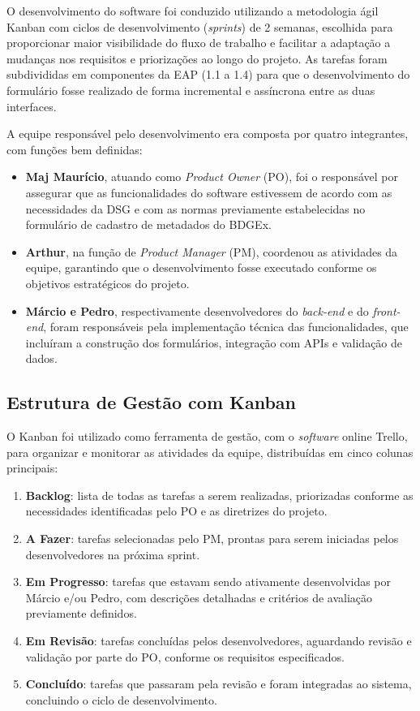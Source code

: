 O desenvolvimento do software foi conduzido utilizando a metodologia ágil Kanban com ciclos de desenvolvimento (\textit{sprints}) de 2 semanas, escolhida para proporcionar maior visibilidade do fluxo de trabalho e facilitar a adaptação a mudanças nos requisitos e priorizações ao longo do projeto. As tarefas foram subdivididas em componentes da EAP (1.1 a 1.4) para que o desenvolvimento do formulário fosse realizado de forma incremental e assíncrona entre as duas interfaces. 

A equipe responsável pelo desenvolvimento era composta por quatro integrantes, com funções bem definidas:

\begin{itemize}
    \item \textbf{Maj Maurício}, atuando como \textit{Product Owner} (PO), foi o responsável por assegurar que as funcionalidades do software estivessem de acordo com as necessidades da DSG e com as normas previamente estabelecidas no formulário de cadastro de metadados do BDGEx.
    \item \textbf{Arthur}, na função de \textit{Product Manager} (PM), coordenou as atividades da equipe, garantindo que o desenvolvimento fosse executado conforme os objetivos estratégicos do projeto.
    \item \textbf{Márcio e Pedro}, respectivamente desenvolvedores do \textit{back-end} e do \textit{front-end}, foram responsáveis pela implementação técnica das funcionalidades, que incluíram a construção dos formulários, integração com APIs e validação de dados.
\end{itemize}

\subsection{Estrutura de Gestão com Kanban}

O Kanban foi utilizado como ferramenta de gestão, com o \textit{software} online Trello, para organizar e monitorar as atividades da equipe, distribuídas em cinco colunas principais:

\begin{enumerate}
    \item \textbf{Backlog}: lista de todas as tarefas a serem realizadas, priorizadas conforme as necessidades identificadas pelo PO e as diretrizes do projeto.
    \item \textbf{A Fazer}: tarefas selecionadas pelo PM, prontas para serem iniciadas pelos desenvolvedores na próxima sprint.
    \item \textbf{Em Progresso}: tarefas que estavam sendo ativamente desenvolvidas por Márcio e/ou Pedro, com descrições detalhadas e critérios de avaliação previamente definidos.
    \item \textbf{Em Revisão}: tarefas concluídas pelos desenvolvedores, aguardando revisão e validação por parte do PO, conforme os requisitos especificados.
    \item \textbf{Concluído}: tarefas que passaram pela revisão e foram integradas ao sistema, concluindo o ciclo de desenvolvimento.
\end{enumerate}

